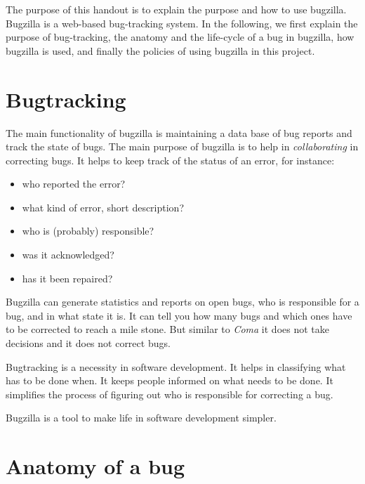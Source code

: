 \documentclass[11pt,nologo,handout]{handout}
\newcommand{\Coma}{\textsl{Coma}}
\begin{document}
\thispagestyle{empty}

The purpose of this handout is to explain the purpose and how to use
bugzilla.  Bugzilla is a web-based bug-tracking system.  In the following,
we first explain the purpose of bug-tracking, the anatomy and the
life-cycle of a bug in bugzilla, how bugzilla is used, and finally the
policies of using bugzilla in this project.


\section{Bugtracking}

The main functionality of bugzilla is maintaining a data base of
bug reports and track the state of bugs.  The main purpose of
bugzilla is to help in \emph{collaborating} in correcting bugs.
It helps to keep track of the status of an error, for instance:
\begin{itemize}
\item who reported the error?
\item what kind of error, short description?
\item who is (probably) responsible?
\item was it acknowledged?
\item has it been repaired?
\end{itemize}

Bugzilla can generate statistics and reports on open bugs, who is
responsible for a bug, and in what state it is.  It can tell you
how many bugs and which ones have to be corrected to reach a mile
stone.  But similar to {\Coma} it does not take decisions and it does
not correct bugs.

Bugtracking is a necessity in software development.  It helps in
classifying what has to be done when.  It keeps people informed on
what needs to be done.  It simplifies the process of figuring out
who is responsible for correcting a bug.

Bugzilla is a tool to make life in software development simpler.





\section{Anatomy of a bug}
\end{document}
